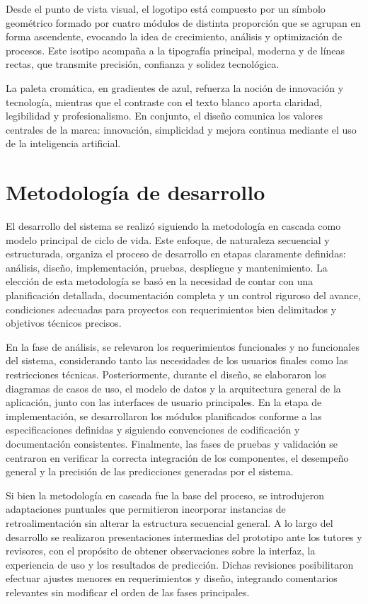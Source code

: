 Desde el punto de vista visual, el logotipo está compuesto por un símbolo geométrico formado por cuatro módulos de distinta proporción que se agrupan en forma ascendente, evocando la idea de crecimiento, análisis y optimización de procesos. Este isotipo acompaña a la tipografía principal, moderna y de líneas rectas, que transmite precisión, confianza y solidez tecnológica.

La paleta cromática, en gradientes de azul, refuerza la noción de innovación y tecnología, mientras que el contraste con el texto blanco aporta claridad, legibilidad y profesionalismo. En conjunto, el diseño comunica los valores centrales de la marca: innovación, simplicidad y mejora continua mediante el uso de la inteligencia artificial.


\section{Metodología de desarrollo}\label{sec:metodologia}

El desarrollo del sistema se realizó siguiendo la metodología en cascada como modelo principal de ciclo de vida. Este enfoque, de naturaleza secuencial y estructurada, organiza el proceso de desarrollo en etapas claramente definidas: análisis, diseño, implementación, pruebas, despliegue y mantenimiento. La elección de esta metodología se basó en la necesidad de contar con una planificación detallada, documentación completa y un control riguroso del avance, condiciones adecuadas para proyectos con requerimientos bien delimitados y objetivos técnicos precisos.

En la fase de análisis, se relevaron los requerimientos funcionales y no funcionales del sistema, considerando tanto las necesidades de los usuarios finales como las restricciones técnicas. Posteriormente, durante el diseño, se elaboraron los diagramas de casos de uso, el modelo de datos y la arquitectura general de la aplicación, junto con las interfaces de usuario principales. En la etapa de implementación, se desarrollaron los módulos planificados conforme a las especificaciones definidas y siguiendo convenciones de codificación y documentación consistentes. Finalmente, las fases de pruebas y validación se centraron en verificar la correcta integración de los componentes, el desempeño general y la precisión de las predicciones generadas por el sistema.

Si bien la metodología en cascada fue la base del proceso, se introdujeron adaptaciones puntuales que permitieron incorporar instancias de retroalimentación sin alterar la estructura secuencial general. A lo largo del desarrollo se realizaron presentaciones intermedias del prototipo ante los tutores y revisores, con el propósito de obtener observaciones sobre la interfaz, la experiencia de uso y los resultados de predicción. Dichas revisiones posibilitaron efectuar ajustes menores en requerimientos y diseño, integrando comentarios relevantes sin modificar el orden de las fases principales. 

